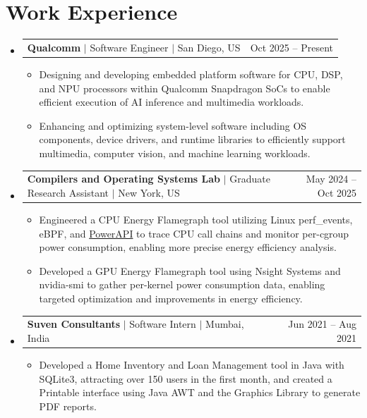 \documentclass[letterpaper,11pt]{article}
\makeatletter
\newcommand{\resumeItem}[1]{
  \item\small{
    {#1 \vspace{-2pt}}
  }
}
\newcommand{\resumeSubSubheading}[2]{
  \vspace{-2pt}\item
    \begin{tabular*}{1.0\textwidth}[t]{l@{\extracolsep{\fill}}r}
      \small #1 & \small #2 \\
    \end{tabular*}\vspace{-7pt}
}
\newcommand{\resumeSubHeadingListStart}{\begin{itemize}[leftmargin=0.0in, label={}]}
\newcommand{\resumeSubHeadingListEnd}{\end{itemize}}
\newcommand{\resumeItemListStart}{\begin{itemize}}
\newcommand{\resumeItemListEnd}{\end{itemize}\vspace{-5pt}}
\makeatother
\begin{document}
\section{Work Experience}
\resumeSubHeadingListStart
\resumeSubSubheading{\normalsize{\textbf{Qualcomm} $|$ Software Engineer $|$ San Diego, US}}{Oct 2025 -- Present}
\resumeItemListStart
\resumeItem{
  Designing and developing embedded platform software for CPU, DSP, and NPU processors within Qualcomm Snapdragon SoCs to enable efficient execution of AI inference and multimedia workloads.
}
\resumeItem{
  Enhancing and optimizing system-level software including OS components, device drivers, and runtime libraries to efficiently support multimedia, computer vision, and machine learning workloads.
}
\resumeItemListEnd
\vspace{-3pt}

\resumeSubSubheading{\normalsize{\textbf{Compilers and Operating Systems Lab} $|$ Graduate Research Assistant $|$ New York, US}}{May 2024 -- Oct 2025}
\resumeItemListStart
\resumeItem{
  Engineered a CPU Energy Flamegraph tool utilizing Linux perf\_events, eBPF, and \href{https://powerapi.org/}{PowerAPI} to trace CPU call chains and monitor per-cgroup power consumption, enabling more precise energy efficiency analysis.
}
\resumeItem{
  Developed a GPU Energy Flamegraph tool using Nsight Systems and nvidia-smi to gather per-kernel power consumption data, enabling targeted optimization and improvements in energy efficiency.
}
\resumeItemListEnd
\vspace{-3pt}

\resumeSubSubheading
{\normalsize{\textbf{Suven Consultants} $|$ Software Intern $|$ Mumbai, India}}{Jun 2021 -- Aug 2021}
\resumeItemListStart
\resumeItem{Developed a Home Inventory and Loan Management tool in Java with SQLite3, attracting over 150 users in the first month, and created a Printable interface using Java AWT and the Graphics Library to generate PDF reports.}
\resumeItemListEnd
\resumeSubHeadingListEnd
\vspace{-16pt}
\end{document}
